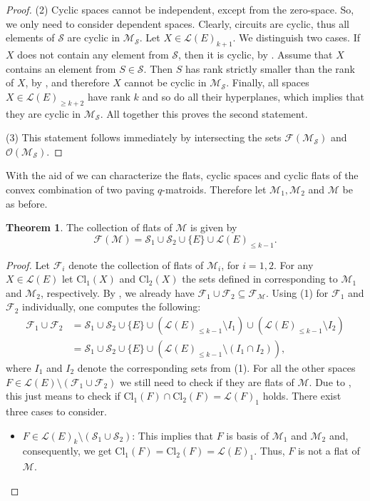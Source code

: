 \documentclass[a4paper,11pt,reqno]{amsart}
\theoremstyle{definition}
\newtheorem{theorem}{Theorem}[section]
\newcommand{\mM}{\mathcal{M}}
\newcommand{\mL}{\mathcal{L}}
\newcommand{\mF}{\mathcal{F}}
\newcommand{\mO}{\mathcal{O}}
\newcommand{\mS}{\mathcal{S}}
\begin{document}
{\begin{proof}
    (2) Cyclic spaces cannot be independent, except from the zero-space. So, we only need to consider dependent spaces. Clearly, circuits are cyclic, thus all elements of $\mS$ are cyclic in $\mM_{\mS}$. Let $X\in\mL(E)_{k+1}$. We distinguish two cases. If $X$ does not contain any element from $\mS$, then it is cyclic, by . Assume that $X$ contains an element from $S\in\mS$. Then $S$ has rank strictly smaller than the rank of $X$, by , and therefore $X$ cannot be cyclic in $\mM_{\mS}$. Finally, all spaces $X\in\mL(E)_{\geq k+2}$ have rank $k$ and so do all their hyperplanes, which implies that they are cyclic in $\mM_{\mS}$. All together this proves the second statement.

    (3) This statement follows immediately by intersecting the sets $\mF(\mM_{\mS})$ and $\mO(\mM_{\mS})$.
\end{proof}

With the aid of  we can characterize the flats, cyclic spaces and cyclic flats of the convex combination of two paving $q$-matroids. Therefore let $\mM_1,\mM_2$ and $\mM$ be as before.

\begin{theorem}\label{thm: flats_paving_conv_comb}
   The collection of flats of $\mM$ is given by
    \[
        \mF(\mM)=\mS_1\cup\mS_2\cup\{E\}\cup\mL(E)_{\leq k-1}.
    \]   
\end{theorem}
\begin{proof}
 Let $\mF_i$ denote the collection of flats of $\mM_i$, for $i=1,2$. For any $X\in\mL(E)$ let $\text{Cl}_1(X)$ and $\text{Cl}_2(X)$ the sets defined in  corresponding to $\mM_1$ and $\mM_2$, respectively. By , we already have $\mF_1\cup\mF_2\subseteq\mF_{\mM}$. Using  (1) for $\mF_1$ and $\mF_2$ individually, one computes the following:
    \begin{align*}
        \mF_1\cup\mF_2 &= \mS_1\cup\mS_2\cup\{E\}\cup(\mL(E)_{\leq k-1}\setminus I_1)\cup(\mL(E)_{\leq k-1}\setminus I_2)\\
        &= \mS_1\cup\mS_2\cup\{E\}\cup(\mL(E)_{\leq k-1}\setminus (I_1\cap I_2)),
    \end{align*}
    where $I_1$ and $I_2$ denote the corresponding sets from (1). For all the other spaces $F\in\mL(E)\setminus(\mF_1\cup\mF_2)$ we still need to check if they are flats of $\mM$. Due to , this just means to check if $\text{Cl}_1(F)\cap\text{Cl}_2(F)=\mL(F)_1$ holds. There exist three cases to consider.
    \begin{itemize}
        \item $F\in\mL(E)_k\setminus(\mS_1\cup\mS_2)$: This implies that $F$ is basis of $\mM_1$ and $\mM_2$ and, consequently, we get $\text{Cl}_1(F)=\text{Cl}_2(F)=\mL(E)_1$. Thus, $F$ is not a flat of $\mM$.


\end{itemize}
\end{proof}}
\end{document}

